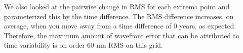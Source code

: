 We also looked at the pairwise change in RMS for each extrema point and parameterized this by the time difference. The RMS difference increases, on average, when you move away from a time difference of 0 years, as expected. Therefore, the maximum amount of wavefront error that can be attributed to time variability is on order 60 nm RMS on this grid.
